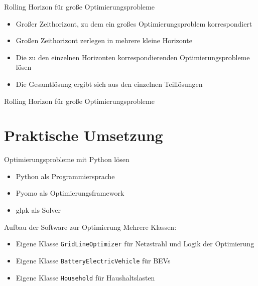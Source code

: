 \documentclass[aspectratio=169]{beamer}
\begin{document}
\begin{frame}{Rolling Horizon für große Optimierungsprobleme}
	\begin{itemize}[<+->]
		\item Großer Zeithorizont, zu dem ein großes Optimierungsproblem
		korrespondiert
		\item Großen Zeithorizont zerlegen in mehrere kleine Horizonte
		\item Die zu den einzelnen Horizonten korrespondierenden 
		Optimierungsprobleme lösen
		\item Die Gesamtlösung ergibt sich aus den einzelnen Teillösungen
	\end{itemize}
\end{frame}


\begin{frame}{Rolling Horizon für große Optimierungsprobleme}
	\begin{figure}
		\centering
		
	\end{figure}
\end{frame}


\section{Praktische Umsetzung}

\begin{frame}{Optimierungsprobleme mit Python lösen}
	\begin{itemize}
		\item Python als Programmiersprache
		\item Pyomo als Optimierungsframework
		\item glpk als Solver
	\end{itemize}
\end{frame}


\begin{frame}{Aufbau der Software zur Optimierung}
	Mehrere Klassen:
	\begin{itemize}[<+(1)->]
		\item Eigene Klasse \texttt{GridLineOptimizer} für Netzstrahl und 
		Logik der Optimierung
		\item Eigene Klasse \texttt{BatteryElectricVehicle} für BEVs
		\item Eigene Klasse \texttt{Household} für Haushaltslasten
	\end{itemize}
	
\end{frame}
\end{document}
